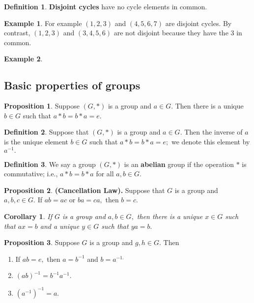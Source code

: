 \documentclass[12pt, a4paper]{article}
\theoremstyle{definition}
\newtheorem{definition}{Definition}[section]
\newtheorem*{example}{Example}
\newtheorem{proposition}{Proposition}
\theoremstyle{plain}
\newtheorem{corollary}{Corollary}[theorem]
\begin{document}
\begin{definition}
\textbf{Disjoint cycles} have no cycle elements in common.
\end{definition}

\begin{example}
For example $(1,2,3)$ and $(4,5,6,7)$ are disjoint cycles.
By contrast, $(1,2,3)$ and $(3,4,5,6)$ are not disjoint because they have the 3 in common.
\end{example}

\begin{example}

\end{example}

\subsection{Basic properties of groups}

\begin{proposition}
Suppose $(G,*)$ is a group and $a \in G.$ Then there is a unique $b\in G$ such that $a*b=b*a=e.$
\end{proposition}

\begin{definition}
Suppose that $(G,*)$ is a group and $a \in G.$ Then the inverse of $a$ is the unique element $b \in G$ such that $a * b = b * a = e;$ we denote this element by $a^{-1}.$
\end{definition}

\begin{definition}
We say a group $(G,*)$ is an \textbf{abelian} group if the operation $*$ is commutative; i.e., $a * b = b * a$ for all $a, b \in G.$
\end{definition}

\begin{proposition}\textbf{(Cancellation Law).}
Suppose that $G$ is a group and $a, b, c \in G.$ If $ab = ac$ or $ba=ca,$ then $b=c.$
\end{proposition}

\begin{corollary}
If $G$ is a group and $a,b \in G,$ then there is a unique $x \in G$ such that $ax = b$ and a unique $y \in G$ such that $ya = b.$
\end{corollary}

\begin{proposition}
Suppose $G$ is a group and $g, h \in G.$ Then 
\begin{enumerate}
	
	\item If $ab=e,$ then $a=b^{-1}$ and $b=a^{-1.}$

	\item $(ab)^{-1}=b^{-1}a^{-1}.$

	\item $(a^{-1})^{-1}=a.$

\end{enumerate}
\end{proposition}
\end{document}
